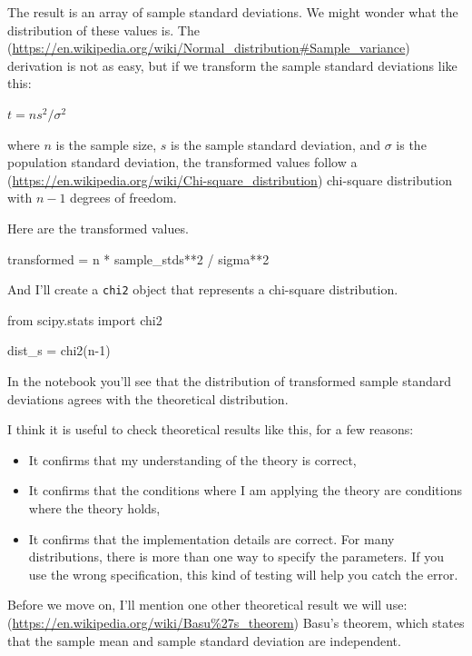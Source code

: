 \documentclass[12pt]{book}
\theoremstyle{exercise}
\newcommand{\py}[1]{{\tt #1}}%
\begin{document}
The result is an array of sample standard deviations. We might wonder
what the distribution of these values is. The
(\url{https://en.wikipedia.org/wiki/Normal_distribution\#Sample_variance}) derivation
is not as easy, but if we transform the sample standard deviations like
this:

$t = n s^2 / \sigma^2$

where $n$ is the sample size, $s$ is the sample standard deviation,
and $\sigma$ is the population standard deviation, the transformed
values follow a
(\url{https://en.wikipedia.org/wiki/Chi-square_distribution}) chi-square
distribution with $n-1$ degrees of freedom.

Here are the transformed values.

\begin{code}
transformed = n * sample_stds**2 / sigma**2
\end{code}

And I'll create a \py{chi2} object that represents
a chi-square distribution.

\begin{code}
from scipy.stats import chi2

dist_s = chi2(n-1)
\end{code}

In the notebook you'll see that the distribution of transformed sample standard deviations agrees with
the theoretical distribution.

I think it is useful to check theoretical results like this, for a few
reasons:

\begin{itemize}
\item
  It confirms that my understanding of the theory is correct,

\item
  It confirms that the conditions where I am applying the theory are
  conditions where the theory holds,

\item
  It confirms that the implementation details are correct. For many
  distributions, there is more than one way to specify the parameters.
  If you use the wrong specification, this kind of testing will help you
  catch the error.
\end{itemize}

Before we move on, I'll mention one other theoretical result we will
use: (\url{https://en.wikipedia.org/wiki/Basu\%27s_theorem})
Basu's theorem, which states that the sample mean and sample standard
deviation are independent.
\end{document}
